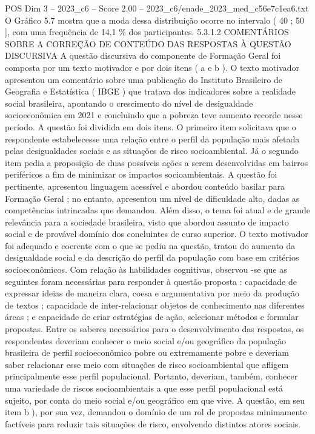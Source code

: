 \begin{textsample}{POS Dim 3 – 2023\_c6 – Score 2.00 – 2023\_c6/enade\_2023\_med\_c56e7c1ea6.txt}
O Gráfico 5.7 mostra que a moda dessa distribuição ocorre no intervalo ( 40 ; 50 ], com uma frequência de 14,1 \% dos participantes. 5.3.1.2 COMENTÁRIOS SOBRE A CORREÇÃO DE CONTEÚDO DAS RESPOSTAS À QUESTÃO DISCURSIVA A questão discursiva do componente de Formação Geral foi composta por um texto motivador e por dois itens ( a e b ).
O texto motivador apresentou um comentário sobre uma publicação do Instituto Brasileiro de Geografia e Estatística ( IBGE ) que tratava dos indicadores sobre a realidade social brasileira, apontando o crescimento do nível de desigualdade socioeconômica em 2021 e concluindo que a pobreza teve aumento recorde nesse período.
A questão foi dividida em dois itens.
O primeiro item solicitava que o respondente estabelecesse uma relação entre o perfil da população mais afetada pelas desigualdades sociais e as situações de risco socioambiental.
Já o segundo item pedia a proposição de duas possíveis ações a serem desenvolvidas em bairros periféricos a fim de minimizar os impactos socioambientais.
A questão foi pertinente, apresentou linguagem acessível e abordou conteúdo basilar para Formação Geral ; no entanto, apresentou um nível de dificuldade alto, dadas as competências intrincadas que demandou.
Além disso, o tema foi atual e de grande relevância para a sociedade brasileira, visto que abordou assunto de impacto social e de provável domínio dos concluintes de curso superior.
O texto motivador foi adequado e coerente com o que se pediu na questão, tratou do aumento da desigualdade social e da descrição do perfil da população com base em critérios socioeconômicos.
Com relação às habilidades cognitivas, observou -se que as seguintes foram necessárias para responder à questão proposta : capacidade de expressar ideias de maneira clara, coesa e argumentativa por meio da produção de textos ; capacidade de inter-relacionar objetos de conhecimento nas diferentes áreas ; e capacidade de criar estratégias de ação, selecionar métodos e formular propostas.
Entre os saberes necessários para o desenvolvimento das respostas, os respondentes deveriam conhecer o meio social e/ou geográfico da população brasileira de perfil socioeconômico pobre ou extremamente pobre e deveriam saber relacionar esse meio com situações de risco socioambiental que afligem principalmente esse perfil populacional.
Portanto, deveriam, também, conhecer uma variedade de riscos socioambientais a que esse perfil populacional está sujeito, por conta do meio social e/ou geográfico em que vive.
A questão, em seu item b ), por sua vez, demandou o domínio de um rol de propostas minimamente factíveis para reduzir tais situações de risco, envolvendo distintos atores sociais.

\end{textsample}
